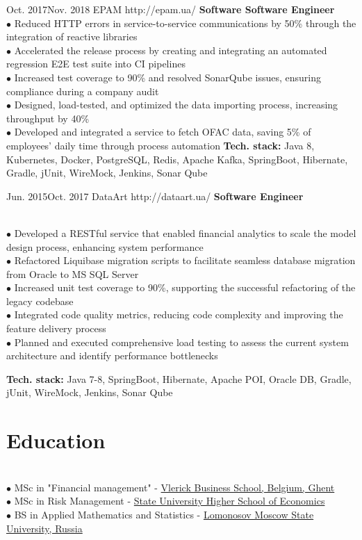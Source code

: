 \documentclass[10pt]{article} %
\begin{document}
\job
{Oct. 2017}{Nov. 2018}
{EPAM}
{http://epam.ua/}
{\textbf{Software Software Engineer}}
{
\textbf{}    
\\$\bullet$ Reduced HTTP errors in service-to-service communications by 50\% through the integration of reactive libraries
\\$\bullet$ Accelerated the release process by creating and integrating an automated regression E2E test suite into CI pipelines
\\$\bullet$ Increased test coverage to 90\% and resolved SonarQube issues, ensuring compliance during a company audit
\\$\bullet$ Designed, load-tested, and optimized the data importing process, increasing throughput by 40\%
\\$\bullet$ Developed and integrated a service to fetch OFAC data, saving 5\% of employees’ daily time through process automation
\vadjust{\vspace{4pt}}
\newline
\textbf{Tech. stack: }{Java 8, Kubernetes, Docker, PostgreSQL, Redis, Apache Kafka, SpringBoot, Hibernate, Gradle, jUnit, WireMock, Jenkins, Sonar Qube}  
 }

\job
{Jun. 2015}{Oct. 2017}
{DataArt}
{http://dataart.ua/}
{\textbf{Software Engineer}}
{
\textbf{}  
\\$\bullet$ Developed a RESTful service that enabled financial analytics to scale the model design process, enhancing system performance
\\$\bullet$ Refactored Liquibase migration scripts to facilitate seamless database migration from Oracle to MS SQL Server
\\$\bullet$ Increased unit test coverage to 90\%, supporting the successful refactoring of the legacy codebase
\\$\bullet$ Integrated code quality metrics, reducing code complexity and improving the feature delivery process
\\$\bullet$ Planned and executed comprehensive load testing to assess the current system architecture and identify performance bottlenecks
\vadjust{\vspace{4pt}}
\newline

\textbf{Tech. stack: }{Java 7-8, SpringBoot, Hibernate, Apache POI, Oracle DB, Gradle, jUnit, WireMock, Jenkins, Sonar Qube}  
 }
 
 \section{Education}
 {
 \textbf{}  
 \\$\bullet$ MSc in "Financial management"  - \href{https://www.vlerick.com/en}{Vlerick Business School, Belgium, Ghent}
\\$\bullet$  MSc in Risk Management  - \href{https://www.hse.ru}{State University  Higher School of Economics}
\\$\bullet$  BS in Applied Mathematics and Statistics - \href{http://www.msu.ru/en/}{Lomonosov Moscow State University, Russia}
 }
\end{document}
